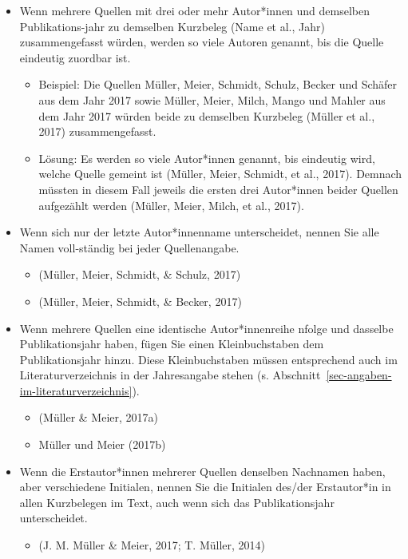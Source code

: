 \documentclass[
  letterpaper,
  DIV=11]{scrreprt}
\providecommand{\tightlist}{%
  \setlength{\itemsep}{0pt}\setlength{\parskip}{0pt}}\usepackage{longtable,booktabs,array}
\begin{document}
\begin{itemize}
\item
  Wenn mehrere Quellen mit drei oder mehr Autor*innen und demselben
  Publikations-jahr zu demselben Kurzbeleg (Name et al., Jahr)
  zusammengefasst würden, werden so viele Autoren genannt, bis die
  Quelle eindeutig zuordbar ist.

  \begin{itemize}
  \item
    Beispiel: Die Quellen Müller, Meier, Schmidt, Schulz, Becker und
    Schäfer aus dem Jahr 2017 sowie Müller, Meier, Milch, Mango und
    Mahler aus dem Jahr 2017 würden beide zu demselben Kurzbeleg (Müller
    et al., 2017) zusammengefasst.
  \item
    Lösung: Es werden so viele Autor*innen genannt, bis eindeutig wird,
    welche Quelle gemeint ist (Müller, Meier, Schmidt, et al., 2017).
    Demnach müssten in diesem Fall jeweils die ersten drei Autor*innen
    beider Quellen aufgezählt werden (Müller, Meier, Milch, et al.,
    2017).
  \end{itemize}
\item
  Wenn sich nur der letzte Autor*innenname unterscheidet, nennen Sie
  alle Namen voll-ständig bei jeder Quellenangabe.

  \begin{itemize}
  \item
    (Müller, Meier, Schmidt, \& Schulz, 2017)
  \item
    (Müller, Meier, Schmidt, \& Becker, 2017)
  \end{itemize}
\item
  Wenn mehrere Quellen eine identische Autor*innenreihe nfolge und
  dasselbe Publikationsjahr haben, fügen Sie einen Kleinbuchstaben dem
  Publikationsjahr hinzu. Diese Kleinbuchstaben müssen entsprechend auch
  im Literaturverzeichnis in der Jahresangabe stehen (s.
  Abschnitt~\ref{sec-angaben-im-literaturverzeichnis}).

  \begin{itemize}
  \item
    (Müller \& Meier, 2017a)
  \item
    Müller und Meier (2017b)
  \end{itemize}
\item
  Wenn die Erstautor*innen mehrerer Quellen denselben Nachnamen haben,
  aber verschiedene Initialen, nennen Sie die Initialen des/der
  Erstautor*in in allen Kurzbelegen im Text, auch wenn sich das
  Publikationsjahr unterscheidet.

  \begin{itemize}
  \tightlist
  \item
    (J. M. Müller \& Meier, 2017; T. Müller, 2014)
  \end{itemize}
\end{itemize}
\end{document}
